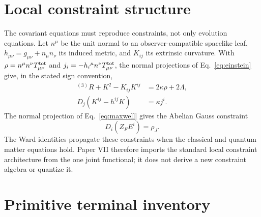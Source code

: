 \documentclass[11pt]{article}
\begin{document}
\section{Local constraint structure}

The covariant equations must reproduce constraints, not only evolution
equations. Let $n^\mu$ be the unit normal to an observer-compatible spacelike
leaf, $h_{\mu\nu}=g_{\mu\nu}+n_\mu n_\nu$ its induced metric, and $K_{ij}$ its
extrinsic curvature. With
$\rho=n^\mu n^\nu T^{\rm tot}_{\mu\nu}$ and
$j_i=-h_i{}^\mu n^\nu T^{\rm tot}_{\mu\nu}$, the normal projections of
Eq.~\eqref{eq:einstein} give, in the stated sign convention,
\begin{align}
{}^{(3)}R+K^2-K_{ij}K^{ij}&=2\kappa\rho+2\Lambda,
\label{eq:hamconstraint}\\
D_j(K^{ij}-h^{ij}K)&=\kappa j^i.
\label{eq:momconstraint}
\end{align}
The normal projection of Eq.~\eqref{eq:maxwell} gives the Abelian Gauss
constraint
\begin{equation}
D_i(Z_FE^i)=\rho_J.
\label{eq:gaussconstraint}
\end{equation}
The Ward identities propagate these constraints when the classical and
quantum matter equations hold. Paper VII therefore imports the standard local
constraint architecture from the one joint functional; it does not derive a
new constraint algebra or quantize it.

\section{Primitive terminal inventory}
\end{document}
